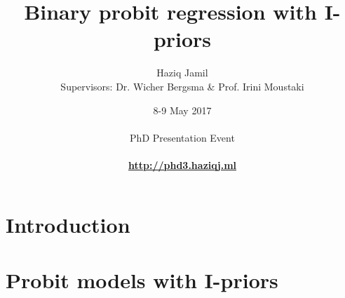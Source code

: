 \documentclass[]{beamer}
\begin{document}

\title[I-prior probit]{Binary probit regression with I-priors}
\author[Haziq Jamil]{\large{Haziq Jamil}\\ \footnotesize{Supervisors: Dr. Wicher Bergsma \& Prof. Irini Moustaki}}
\date[8-9 May 2017]{8-9 May 2017\\
\hspace{1cm}\\
PhD Presentation Event\\
\hspace{1cm}\\
\href{http://phd3.haziqj.ml}{\color{fu-red} \textbf{http://phd3.haziqj.ml}}
}

\begin{frame}[plain]
  \addtocounter{framenumber}{-1}
  \titlepage
\end{frame}


\mytoc


\section{Introduction}


\section[Probit with I-priors]{Probit models with I-priors}
\transition

\end{document}
